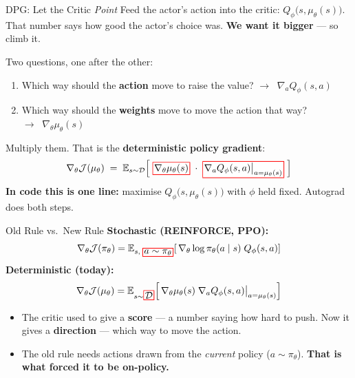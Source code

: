 \begin{frame}{DPG: Let the Critic \emph{Point} }
\vspace{0.4em}
Feed the actor's action into the critic: $Q_\phi\big(s, \mu_\theta(s)\big)$. That number says how good the actor's choice was. \textbf{We want it bigger} --- so climb it.
\pause
\vspace{0.7em}

Two questions, one after the other:
\begin{enumerate}
    \setlength{\itemsep}{0.35em}
    \item Which way should the \textbf{action} move to raise the value? \hfill $\rightarrow\;\; \nabla_a Q_\phi(s,a)$
    \item Which way should the \textbf{weights} move to move the action that way? \hfill $\rightarrow\;\; \nabla_\theta \mu_\theta(s)$
\end{enumerate}
\pause
\vspace{0.6em}
Multiply them. That is the \textbf{deterministic policy gradient}:
\[
\nabla_\theta \mathcal{J}(\mu_\theta) \;=\; \mathbb{E}_{s \sim \mathcal{D}}\!\left[\;
\rbox{\nabla_\theta \mu_\theta(s)} \;\cdot\; \rbox{\nabla_a Q_\phi(s,a)\big|_{a=\mu_\theta(s)}}
\;\right]
\]
\vspace{0.2em}
\centering
\textbf{In code this is one line:} maximise $Q_\phi\big(s,\mu_\theta(s)\big)$ with $\phi$ held fixed. Autograd does both steps.
\end{frame}

\begin{frame}{Old Rule vs.\ New Rule}
\vspace{0.4em}
\textbf{Stochastic (REINFORCE, PPO):}
\[
\nabla_\theta \mathcal{J}(\pi_\theta) = \mathbb{E}_{s,\; \rbox{a \sim \pi_\theta}}\!\left[\, \nabla_\theta \log \pi_\theta(a \mid s)\; Q_\phi(s, a) \right]
\]
\textbf{Deterministic (today):}
\[
\nabla_\theta \mathcal{J}(\mu_\theta) = \mathbb{E}_{s \sim \rbox{\mathcal{D}}}\!\left[\, \nabla_\theta \mu_\theta(s)\; \nabla_a Q_\phi(s, a)\big|_{a=\mu_\theta(s)} \right]
\]
\vspace{0.4em}
\begin{itemize}
    \setlength{\itemsep}{0.5em}
    \item The critic used to give a \textbf{score} --- a number saying how hard to push. Now it gives a \textbf{direction} --- which way to move the action.
    \item The old rule needs actions drawn from the \emph{current} policy ($a \sim \pi_\theta$). \textbf{That is what forced it to be on-policy.}
\end{itemize}
\end{frame}
